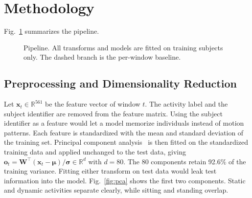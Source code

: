 \documentclass[conference]{IEEEtran}
\begin{document}
\section{Methodology}
Fig.~\ref{fig:pipeline} summarizes the pipeline.

\begin{figure}[t]
\centering
{}
\caption{Pipeline. All transforms and models are fitted on training subjects only. The dashed branch is the per-window baseline.}
\label{fig:pipeline}
\end{figure}

\subsection{Preprocessing and Dimensionality Reduction}
Let $\mathbf{x}_t\in\mathbb{R}^{561}$ be the feature vector of window $t$. The activity label and the subject identifier are removed from the feature matrix. Using the subject identifier as a feature would let a model memorize individuals instead of motion patterns. Each feature is standardized with the mean and standard deviation of the training set. Principal component analysis~\cite{jolliffe2002pca} is then fitted on the standardized training data and applied unchanged to the test data, giving $\mathbf{o}_t=\mathbf{W}^\top(\mathbf{x}_t-\boldsymbol{\mu})/\boldsymbol{\sigma}\in\mathbb{R}^{d}$ with $d=80$. The 80 components retain 92.6\% of the training variance. Fitting either transform on test data would leak test information into the model. Fig.~\ref{fig:pca} shows the first two components. Static and dynamic activities separate clearly, while sitting and standing overlap.
\end{document}

